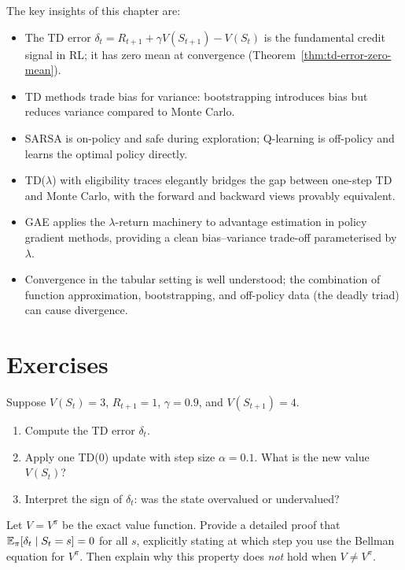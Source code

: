The key insights of this chapter are:
\begin{itemize}[leftmargin=*]
  \item The TD error $\delta_t = R_{t+1}+\gamma V(S_{t+1})-V(S_t)$ is the fundamental credit signal in RL; it has zero mean at convergence (Theorem~\ref{thm:td-error-zero-mean}).
  \item TD methods trade bias for variance: bootstrapping introduces bias but reduces variance compared to Monte Carlo.
  \item SARSA is on-policy and safe during exploration; Q-learning is off-policy and learns the optimal policy directly.
  \item TD($\lambda$) with eligibility traces elegantly bridges the gap between one-step TD and Monte Carlo, with the forward and backward views provably equivalent.
  \item GAE applies the $\lambda$-return machinery to advantage estimation in policy gradient methods, providing a clean bias--variance trade-off parameterised by $\lambda$.
  \item Convergence in the tabular setting is well understood; the combination of function approximation, bootstrapping, and off-policy data (the deadly triad) can cause divergence.
\end{itemize}


\section*{Exercises}

\begin{exercise}
\label{ex:td-error-basic}
Suppose $V(S_t)=3$, $R_{t+1}=1$, $\gamma=0.9$, and $V(S_{t+1})=4$.
\begin{enumerate}[label=(\alph*)]
  \item Compute the TD error $\delta_t$.
  \item Apply one TD(0) update with step size $\alpha=0.1$.  What is the new value $V(S_t)$?
  \item Interpret the sign of $\delta_t$: was the state overvalued or undervalued?
\end{enumerate}
\end{exercise}

\begin{exercise}
\label{ex:td-error-zero-mean}
Let $V = V^\pi$ be the exact value function.  Provide a detailed proof that $\operatorname{\mathbb{E}}_\pi[\delta_t \mid S_t=s]=0$ for all $s$, explicitly stating at which step you use the Bellman equation for $V^\pi$.  Then explain why this property does \emph{not} hold when $V \ne V^\pi$.
\end{exercise}

